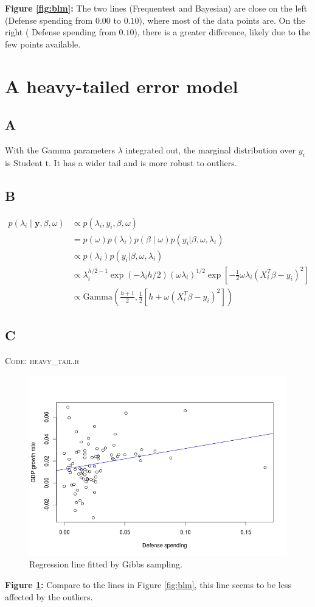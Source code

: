 \documentclass{article}
\begin{document}
\noindent
\textbf{Figure \ref{fig:blm}:} The two lines (Frequentest and Bayesian) are close on the left (Defense spending from \(0.00\) to \(0.10\)), where most of the data points are. On the right ( Defense spending from \(0.10\)), there is a greater difference, likely due to the few points available. 

\section*{A heavy-tailed error model}
\subsection*{A}
With the Gamma parameters \(\lambda\) integrated out, the marginal distribution over \(y_i\) is Student t. It has a wider tail and is more robust to outliers.

\subsection*{B}
\begin{align*}
p(\lambda_i \mid \mathbf{y}, \beta, \omega) & \propto p(\lambda_i, y_i, \beta, \omega)\\
&= p(\omega) p(\lambda_i) p(\beta \mid \omega) p(y_i |\beta , \omega, \lambda_i)\\
&\propto p(\lambda_i)  p(y_i |\beta , \omega, \lambda_i)\\
&\propto \lambda_i ^{h/2 - 1} \exp \left(- \lambda_i h/2 \right) (\omega \lambda_i)^{1/2} \exp \left[ -\frac{1}{2} \omega \lambda_i (X_i^T\beta - y_i)^2 \right]\\
&\propto \mathrm{Gamma}\left(\frac{h+1}{2}, \frac{1}{2}[h + \omega (X_i^T\beta - y_i)^2]\right)
\end{align*}
\subsection*{C}
\textsc{Code: heavy\_tail.r}

\begin{figure}[h!]
\includegraphics[width=\linewidth]{heavy_tail.jpeg}
\caption{Regression line fitted by Gibbs sampling.}
\label{fig:heavy}
\end{figure}

\noindent
\textbf{Figure \ref{fig:heavy}:} Compare to the lines in Figure \ref{fig:blm}, this line seems to be less affected by the outliers.
\end{document}
